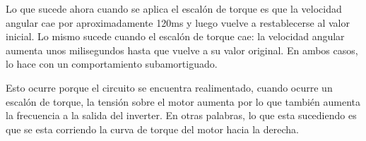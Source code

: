 \documentclass[e4_tp3_main.tex]{subfiles}
\begin{document}
Lo que sucede ahora cuando se aplica el escal\'on de torque es que la velocidad angular cae por aproximadamente 120ms y luego vuelve a restablecerse al valor inicial. Lo mismo sucede cuando el escal\'on de torque cae: la velocidad angular aumenta unos milisegundos hasta que vuelve a su valor original. En ambos casos, lo hace con un comportamiento subamortiguado.  
\vspace{0.5cm}

Esto ocurre porque el circuito se encuentra realimentado, cuando ocurre un escal\'on de torque, la tensi\'on sobre el motor aumenta por lo que tambi\'en aumenta la frecuencia a la salida del inverter. En otras palabras, lo que esta sucediendo es que se esta corriendo la curva de torque del motor hacia la derecha. 
\end{document}
